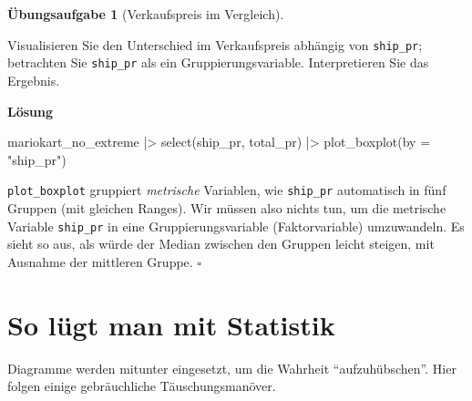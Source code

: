 \documentclass[
  letterpaper,
  twoside,
  open=any]{scrbook}
\newenvironment{Shaded}{\begin{snugshade}}{\end{snugshade}}
\newcommand{\AttributeTok}[1]{\textcolor[rgb]{0.40,0.45,0.13}{#1}}
\newcommand{\FunctionTok}[1]{\textcolor[rgb]{0.28,0.35,0.67}{#1}}
\newcommand{\NormalTok}[1]{\textcolor[rgb]{0.00,0.23,0.31}{#1}}
\newcommand{\SpecialCharTok}[1]{\textcolor[rgb]{0.37,0.37,0.37}{#1}}
\newcommand{\StringTok}[1]{\textcolor[rgb]{0.13,0.47,0.30}{#1}}
\theoremstyle{definition}
\theoremstyle{definition}
\newtheorem{exercise}{Übungsaufgabe}[chapter]
\theoremstyle{definition}
\theoremstyle{remark}
\begin{document}
\begin{exercise}[Verkaufspreis im
Vergleich]\protect\hypertarget{exr-diff-plot}{}\label{exr-diff-plot}

Visualisieren Sie den Unterschied im Verkaufspreis abhängig von
\texttt{ship\_pr}; betrachten Sie \texttt{ship\_pr} als ein
Gruppierungsvariable. Interpretieren Sie das Ergebnis.

\textbf{Lösung}

\begin{Shaded}
\begin{Highlighting}[]
\NormalTok{mariokart\_no\_extreme }\SpecialCharTok{|\textgreater{}} 
  \FunctionTok{select}\NormalTok{(ship\_pr, total\_pr) }\SpecialCharTok{|\textgreater{}} 
  \FunctionTok{plot\_boxplot}\NormalTok{(}\AttributeTok{by =} \StringTok{"ship\_pr"}\NormalTok{)}
\end{Highlighting}
\end{Shaded}

\texttt{plot\_boxplot} gruppiert \emph{metrische} Variablen, wie
\texttt{ship\_pr} automatisch in fünf Gruppen (mit gleichen Ranges). Wir
müssen also nichts tun, um die metrische Variable \texttt{ship\_pr} in
eine Gruppierungsvariable (Faktorvariable) umzuwandeln. Es sieht so aus,
als würde der Median zwischen den Gruppen leicht steigen, mit Ausnahme
der mittleren Gruppe. \(\square\)

\end{exercise}

\section{So lügt man mit Statistik}\label{so-luxfcgt-man-mit-statistik}

Diagramme werden mitunter eingesetzt, um die Wahrheit
\enquote{aufzuhübschen}. Hier folgen einige gebräuchliche
Täuschungsmanöver.
\end{document}
